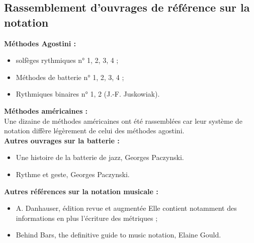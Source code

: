 \subsection*{Rassemblement d’ouvrages de référence sur la notation}
	\textbf{Méthodes Agostini :}
	\begin{itemize}
		\item solfèges rythmiques n° 1, 2, 3, 4 ;
		\item Méthodes de batterie n° 1, 2, 3, 4 ;
		\item Rythmiques binaires n° 1, 2 (J.-F. Juskowiak).\\
	\end{itemize}
	\textbf{Méthodes américaines :}\\
	Une dizaine de méthodes américaines ont été rassemblées car leur système de notation diffère légèrement de celui des méthodes agostini.\\
	
	\textbf{Autres ouvrages sur la batterie :}
	\begin{itemize}
		\item Une histoire de la batterie de jazz, Georges Paczynski.
		\item Rythme et geste, Georges Paczynski.\\
	\end{itemize}
	\textbf{Autres références sur la notation musicale :}
\begin{itemize}
	\item A. Danhauser, édition revue et augmentée
	Elle contient notamment des informations en plus l’écriture des métriques ;
	\item Behind Bars, the definitive guide to music notation, Elaine Gould.\\
\end{itemize}